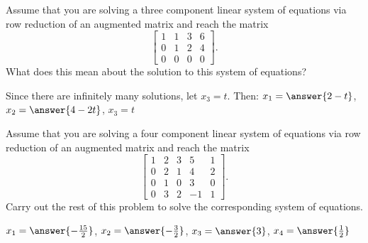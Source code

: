 \documentclass{ximera}
\begin{document}
\begin{exercise}%
    Assume that you are solving a three component linear system of equations via row reduction of an augmented matrix and reach the matrix
    \begin{equation*}
        \left[ 
        \begin{array}{ccc|c}
            1 & 1 & 3 & 6 \\
            0 & 1 & 2 & 4 \\
            0 & 0 & 0 & 0
        \end{array}
        \right].
    \end{equation*}
    What does this mean about the solution to this system of equations?
    \begin{multipleChoice}
    \end{multipleChoice}
    \begin{problem}
        Since there are infinitely many solutions, let $x_3 = t$. Then: $x_1 = \answer{2 - t}$, $x_2 = \answer{4 - 2t}$, $x_3 = t$
    \end{problem}
\end{exercise}

\begin{exercise}
    Assume that you are solving a four component linear system of equations via row reduction of an augmented matrix and reach the matrix
    \begin{equation*}
        \left[ 
        \begin{array}{cccc|c}
            1 & 2 & 3 & 5 & 1 \\
            0 & 2 & 1 & 4 & 2 \\
            0 & 1 & 0 & 3 & 0 \\
            0 & 3 & 2 & -1 & 1
        \end{array}
        \right].
    \end{equation*}
    Carry out the rest of this problem to solve the corresponding system of equations. 
    \begin{multipleChoice}
    \end{multipleChoice}
    \begin{problem}
        $x_1 = \answer{-\frac{15}{2}}$, $x_2 = \answer{-\frac{3}{2}}$, $x_3 = \answer{3}$, $x_4 = \answer{\frac{1}{2}}$
    \end{problem}
\end{exercise}
\end{document}
